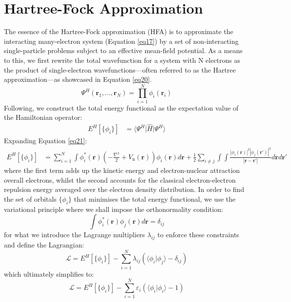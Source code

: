 
\section{Hartree-Fock Approximation}
The essence of the Hartree-Fock approximation (HFA) is to approximate the interacting many-electron system (Equation \ref{eq17}) by a set of non-interacting single-particle problems subject to an effective mean-field potential\supercite{martin2016interacting, helgaker2014molecular, feng2005introduction}. As a means to this, we first rewrite the total wavefunction for a system with N electrons as the product of single-electron wavefunctions---often referred to as the Hartree approximation\supercite{Hartree1928}---as showcased in Equation \ref{eq20}. 
\begin{equation}
  \Psi^H(\mathbf{r}_1, \dots, \mathbf{r}_N) = \prod_{i=1}^N \phi_i(\mathbf{r}_i)
  \label{eq20}
\end{equation}
Following, we construct the total energy functional as the expectation value of the Hamiltonian operator:
\begin{equation}
  \label{eq21}
\begin{aligned}
  E^{H}[\{\phi_i\}] &= \bigg\langle \Psi^H \bigg| \hat{H} \bigg| \Psi^H \bigg\rangle 
\end{aligned}
\end{equation}
Expanding Equation \ref{eq21}:
\begin{equation}
  \label{eq22}
  \begin{split}
    E^{H}[\{\phi_i\}] &= \sum^N_{i=1} \int \phi_i^*(\mathbf{r}) \left(-\frac{\nabla^2}{2} + V_{\text{n}}(\mathbf{r})\right) \phi_i(\mathbf{r}) d\mathbf{r}  + \frac{1}{2} \sum_{i\neq j} \int\int \frac{|\phi_i(\mathbf{r})|^2 |\phi_j(\mathbf{r'})|^2 }{|\mathbf{r} - \mathbf{r'}|} d\mathbf{r} d\mathbf{r'}
  \end{split}
\end{equation}
where the first term adds up the kinetic energy and electron-nuclear attraction overall electrons, whilst the second accounts for the classical electron-electron repulsion energy averaged over the electron density distribution. In order to find the set of orbitals $\{\phi_i\}$ that minimises the total energy functional, we use the variational principle where we shall impose the orthonormality condition: 
\begin{equation}
  \label{eq23}
  \int \phi_i^*(\mathbf{r}) \phi_j(\mathbf{r}) d\mathbf{r} = \delta_{ij}
\end{equation}
for what we introduce the Lagrange multipliers $\lambda_{ij}$ to enforce these constraints and define the Lagrangian:
\begin{equation}
  \label{eq24}
  \mathcal{L} = E^H[\{\phi_i\}] - \sum_{i=1}^{N}\lambda_{ij} ( \langle\phi_i|\phi_j\rangle - \delta_{ij})
\end{equation}
which ultimately simplifies to:
\begin{equation}
  \label{eq25}
  \mathcal{L} = E^H[\{\phi_i\}] - \sum_{i=1}^{N}\varepsilon_{i} ( \langle\phi_i|\phi_i\rangle - 1)
\end{equation}

